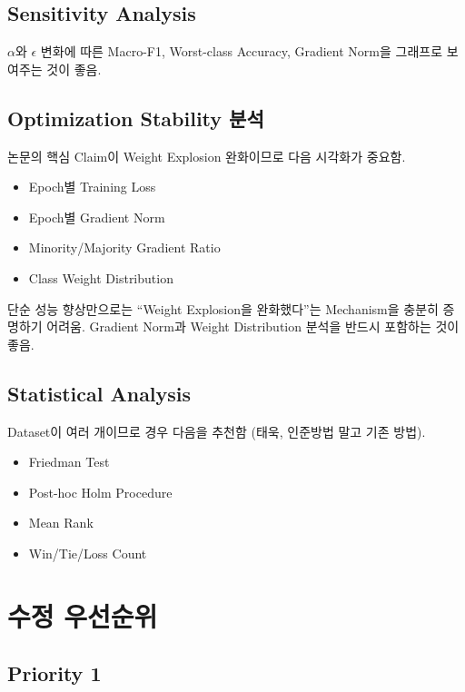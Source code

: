 \documentclass[11pt,a4paper]{article}
\begin{document}
\subsection{Sensitivity Analysis}

\(\alpha\)와 \(\epsilon\) 변화에 따른 Macro-F1, Worst-class Accuracy, Gradient Norm을 그래프로 보여주는 것이 좋음.

\subsection{Optimization Stability 분석}

논문의 핵심 Claim이 Weight Explosion 완화이므로 다음 시각화가 중요함.

\begin{itemize}
\item Epoch별 Training Loss
\item Epoch별 Gradient Norm
\item Minority/Majority Gradient Ratio
\item Class Weight Distribution
\end{itemize}

\begin{tcolorbox}[title=중요]
단순 성능 향상만으로는 ``Weight Explosion을 완화했다''는 Mechanism을 충분히 증명하기 어려움. Gradient Norm과 Weight Distribution 분석을 반드시 포함하는 것이 좋음.
\end{tcolorbox}

\subsection{Statistical Analysis}

Dataset이 여러 개이므로 경우 다음을 추천함 (태욱, 인준방법 말고 기존 방법).

\begin{itemize}
\item Friedman Test
\item Post-hoc Holm Procedure
\item Mean Rank
\item Win/Tie/Loss Count
\end{itemize}

\section{수정 우선순위}

\subsection{Priority 1}
\end{document}

